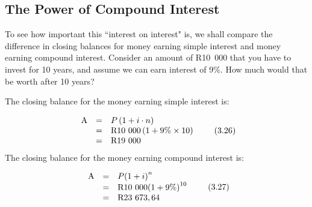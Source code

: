 %       
      \label{m39334*uid63}
            \subsection{ The Power of Compound Interest}
            \nopagebreak
        \label{m39334*id73519}To see how important this ``interest on interest" is, we shall compare the difference in closing balances for money earning simple interest and money earning compound interest. Consider an amount of R10~000 that you have to invest for 10 years, and assume we can earn interest of 9\%. How much would that be worth after 10 years?\par 
        \label{m39334*id73528}The closing balance for the money earning simple interest is:\par 
        \label{m39334*id73532}\nopagebreak\noindent{}
    \begin{equation}
    \begin{array}{ccc}\hfill \mathrm{A}& =& P\left(1+i\ensuremath{\cdot}n\right)\hfill \\ & =& \mathrm{R}10\phantom{\rule{3.33333pt}{0ex}}000\left(1+9\%\ensuremath{\times}10\right)\hfill \\ & =& \mathrm{R}19\phantom{\rule{3.33333pt}{0ex}}000\hfill \end{array}\tag{3.26}
      \end{equation}
        \label{m39334*id73640}The closing balance for the money earning compound interest is:\par 
        \label{m39334*id73644}\nopagebreak\noindent{}
    \begin{equation}
    \begin{array}{ccc}\hfill \mathrm{A}& =& P{\left(1+i\right)}^{n}\hfill \\ & =& \mathrm{R}10\phantom{\rule{3.33333pt}{0ex}}000{\left(1+9\%\right)}^{10}\hfill \\ & =& \mathrm{R}23\phantom{\rule{3.33333pt}{0ex}}673,64\hfill \end{array}\tag{3.27}
      \end{equation}
